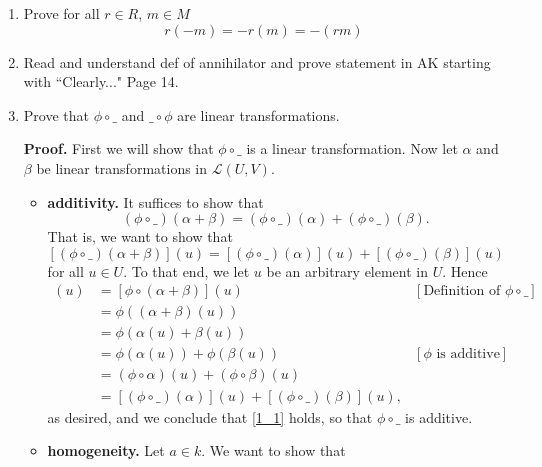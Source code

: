 \documentclass[9pt]{article}
\begin{document}
\begin{enumerate}
   \item Prove for all $r \in R$, $m \in M$
         $$r(-m) = -r(m) = -(rm)$$
   \item Read and understand def of annihilator and prove statement in AK
         starting with ``Clearly..." Page 14.
   \item Prove that $\phi \circ \_$ and $\_ \circ \phi$ are linear
         transformations.

      \textbf{Proof.} First we will show that $\phi \circ \_$ is a linear
      transformation. Now let $\alpha$ and $\beta$ be linear transformations in
      $\mathcal{L}(U, V)$.
      
      \begin{itemize}
         \item \textbf{additivity.} It suffices to show that
               \begin{equation} \label{1_1}
                  (\phi\circ\_)(\alpha+\beta) = (\phi\circ\_)(\alpha) +
                  (\phi\circ\_)(\beta).
               \end{equation}
               That is, we want to show that
               $$[(\phi\circ\_)(\alpha+\beta)](u) = [(\phi\circ\_)(\alpha)](u) +
                 [(\phi\circ\_)(\beta)](u)$$
               for all $u \in U$. To that end, we let $u$ be an arbitrary
               element in $U$. Hence
               \begin{align*}
                  [(\phi\circ\_)(\alpha+\beta)](u) &=
                     [\phi\circ(\alpha+\beta)](u)
                        &[\text{Definition of }\phi\circ\_ ] \\
                     &= \phi((\alpha+\beta)(u)) \\
                     &= \phi(\alpha(u)+\beta(u)) \\
                     &= \phi(\alpha(u))+\phi(\beta(u))
                        &[\phi \text{ is additive}] \\
                     &= (\phi\circ\alpha)(u)+(\phi\circ\beta)(u) \\
                     &= [(\phi\circ\_)(\alpha)](u) + [(\phi\circ\_)(\beta)](u),
               \end{align*}
               as desired, and we conclude that \eqref{1_1} holds, so that
               $\phi\circ\_$ is additive.
         \item \textbf{homogeneity.} Let $a \in k$. We want to show that

\end{itemize}
\end{enumerate}
\end{document}
